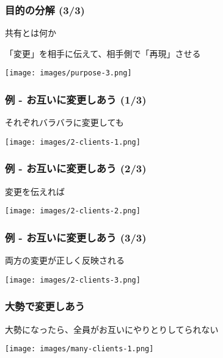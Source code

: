 \documentclass[12pt,dvipdfmx]{beamer}
\begin{document}
\begin{frame}[containsverbatim]
\frametitle{目的の分解 (3/3)}

{\Large 共有}とは何か

\begin{center}
「変更」を相手に伝えて、相手側で「再現」させる
\end{center}

\begin{center}
  \texttt{[image: images/purpose-3.png]}
\end{center}
\end{frame}

\begin{frame}[containsverbatim]
\frametitle{例 - お互いに変更しあう (1/3)}

\begin{center}
それぞれバラバラに変更しても
\end{center}

\begin{center}
  \texttt{[image: images/2-clients-1.png]}
\end{center}
\end{frame}

\begin{frame}[containsverbatim]
\frametitle{例 - お互いに変更しあう (2/3)}

\begin{center}
変更を伝えれば
\end{center}

\begin{center}
  \texttt{[image: images/2-clients-2.png]}
\end{center}
\end{frame}

\begin{frame}[containsverbatim]
\frametitle{例 - お互いに変更しあう (3/3)}

\begin{center}
両方の変更が正しく反映される
\end{center}

\begin{center}
  \texttt{[image: images/2-clients-3.png]}
\end{center}
\end{frame}

\begin{frame}[containsverbatim]
\frametitle{大勢で変更しあう}

\begin{center}
大勢になったら、全員がお互いにやりとりしてられない
\end{center}

\begin{center}
  \texttt{[image: images/many-clients-1.png]}
\end{center}
\end{frame}
\end{document}

